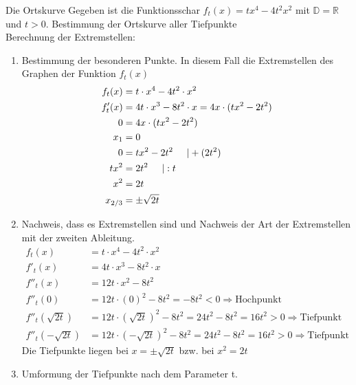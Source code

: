 \begin{bsp}{Die Ortskurve}{}
Gegeben ist die Funktionsschar $f_t(x) = tx^4 - 4t^2x^2$ mit $\mathds{D} = \mathds{R}$ und $t > 0$. Bestimmung der Ortskurve aller Tiefpunkte\\
Berechnung der Extremstellen:
\begin{enumerate}
    \item Bestimmung der besonderen Punkte. In diesem Fall die Extremstellen des Graphen der Funktion $f_t(x)$
\begin{equation*}
    \begin{split}
     f_t(x) &= t\cdot x^4 - 4t^2\cdot x^2\\
     f'_t(x) &= 4t\cdot x^3 -8t^2\cdot x = 4x\cdot(tx^2-2t^2)\\
       0&= 4x\cdot(tx^2-2t^2)\\
       x_1 &= 0\\
       0 &= tx^2 -2t^2 \hspace{0.5cm} | + (2t^2)\\
       tx^2 &= 2t^2 \hspace{0.5cm} | :t \\
       x^2 &= 2t\\
       x_{2/3} &= \pm \sqrt{2t} 
       \end{split}
\end{equation*}
    \item Nachweis, dass es Extremstellen sind und Nachweis der Art der Extremstellen mit der zweiten Ableitung. 
    \begin{equation*}
    \begin{split}
     f_t(x) &= t\cdot x^4 - 4t^2\cdot x^2\\
     f'_t(x) &= 4t\cdot x^3 -8t^2\cdot x \\
       f''_t(x)&= 12t\cdot x^2 -8t^2\\
       f''_t(0) &= 12t \cdot (0)^2 -8t^2 = -8t^2 < 0 \Rightarrow \text{Hochpunkt}\\
       f''_t(\sqrt{2t}) &= 12t \cdot (\sqrt{2t})^2 -8t^2 = 24t^2 -8t^2 = 16t^2 >0 \Rightarrow \text{Tiefpunkt} \\
       f''_t(-\sqrt{2t}) &= 12t \cdot (-\sqrt{2t})^2 -8t^2 = 24t^2 -8t^2 = 16t^2 > 0  \Rightarrow \text{Tiefpunkt}
       \end{split}
\end{equation*}
Die Tiefpunkte liegen bei $x = \pm \sqrt{2t}$ bzw. bei $x^2 = 2t$
\item Umformung der Tiefpunkte nach dem Parameter t.
\begin{equation*}

\end{equation*}
\end{enumerate}
\end{bsp}
